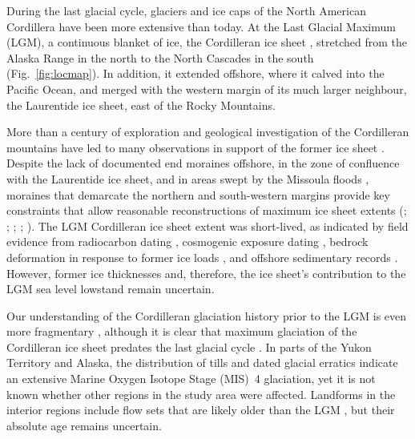 \documentclass[tc]{copernicus}
\begin{document}
\introduction
\label{sec:intro}

During the last glacial cycle, glaciers and ice caps of the North American
Cordillera have been more extensive than today. At the Last Glacial
Maximum (LGM),
a continuous blanket of ice, the Cordilleran ice sheet
\citep{Dawson.1888}, stretched from the Alaska Range in the north to the
North Cascades in the south (Fig.~\ref{fig:locmap}).
In addition, it extended offshore, where it calved
into the Pacific Ocean, and merged with the western margin of its much larger
neighbour, the Laurentide ice sheet, east of the Rocky Mountains.

More than a century of exploration and geological investigation of the
Cordilleran mountains have led to many observations in support of the former
ice sheet
    \citep{Jackson.Clague.1991}.
Despite the lack of documented end moraines offshore, in the zone of confluence
with the Laurentide ice sheet, and in areas swept by the Missoula floods
    \citep{Carrara.etal.1996},
moraines that demarcate the northern and south-western margins provide key
constraints that allow reasonable reconstructions of maximum ice sheet extents
    (\citealp{Prest.etal.1968}; \citealp[Fig. 1.12]{Clague.1989};
     \citealp{Duk-Rodkin.1999};
     \citealp{Booth.etal.2003}; \citealp{Dyke.2004}).
The LGM Cordilleran ice sheet extent was short-lived, as indicated by
field evidence from radiocarbon dating
    \citep{Clague.etal.1980, Clague.1985, Clague.1986, Porter.Swanson.1998,
           Menounos.etal.2008},
cosmogenic exposure dating
    \citep{Stroeven.etal.2010, Stroeven.etal.2014, Margold.etal.2014},
bedrock deformation in response to former ice loads
    \citep{Clague.James.2002, Clague.etal.2005},
and offshore sedimentary records
    \citep{Cosma.etal.2008, Davies.etal.2011}.
However, former ice thicknesses and, therefore, the ice sheet's contribution to
the LGM sea level lowstand
    \citep{Carlson.Clark.2012, Clark.Mix.2002}
remain uncertain.

Our understanding of the Cordilleran glaciation history prior to the LGM is
even more fragmentary
    \citep{Barendregt.Irving.1998, Kleman.etal.2010, Rutter.etal.2012},
although it is clear that maximum glaciation of the Cordilleran ice sheet
predates the last glacial cycle
    \citep{Hidy.etal.2013}.
In parts of the Yukon Territory and Alaska, the distribution of tills
    \citep{Turner.etal.2013}
and dated glacial erratics
    \citep{Ward.etal.2007, Ward.etal.2008, Briner.Kaufman.2008,
           Stroeven.etal.2010, Stroeven.etal.2014}
indicate an extensive Marine Oxygen Isotope Stage (MIS)~4 glaciation,
yet it is not known whether other regions in the study area were affected.
Landforms in the interior regions include flow sets that are likely
older than the LGM
    \citep[Fig.~2]{Kleman.etal.2010},
but their absolute age remains uncertain.
\end{document}
